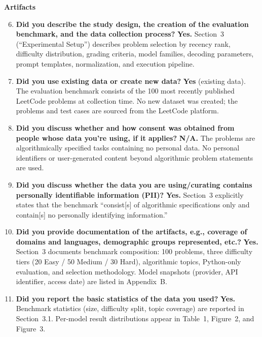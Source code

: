 \documentclass[11pt,a4paper]{article}
\begin{document}
\noindent\textbf{Artifacts}

\begin{enumerate}
\setcounter{enumi}{5}

\item \textbf{Did you describe the study design, the creation of the
  evaluation benchmark, and the data collection process?}
  \textbf{Yes.} Section~3 (``Experimental Setup'') describes problem
  selection by recency rank, difficulty distribution, grading criteria,
  model families, decoding parameters, prompt templates, normalization,
  and execution pipeline.

\item \textbf{Did you use existing data or create new data?}
  \textbf{Yes} (existing data). The evaluation benchmark consists of
  the 100 most recently published LeetCode problems at collection time.
  No new dataset was created; the problems and test cases are sourced
  from the LeetCode platform.

\item \textbf{Did you discuss whether and how consent was obtained
  from people whose data you're using, if it applies?}
  \textbf{N/A.} The problems are algorithmically specified tasks
  containing no personal data. No personal identifiers or user-generated
  content beyond algorithmic problem statements are used.

\item \textbf{Did you discuss whether the data you are using/curating
  contains personally identifiable information (PII)?}
  \textbf{Yes.} Section~3 explicitly states that the benchmark
  ``consist[s] of algorithmic specifications only and contain[s] no
  personally identifying information.''

\item \textbf{Did you provide documentation of the artifacts, e.g.,
  coverage of domains and languages, demographic groups represented,
  etc.?}
  \textbf{Yes.} Section~3 documents benchmark composition: 100 problems,
  three difficulty tiers (20 Easy / 50 Medium / 30 Hard), algorithmic
  topics, Python-only evaluation, and selection methodology. Model
  snapshots (provider, API identifier, access date) are listed in
  Appendix~B.

\item \textbf{Did you report the basic statistics of the data you used?}
  \textbf{Yes.} Benchmark statistics (size, difficulty split, topic
  coverage) are reported in Section~3.1. Per-model result distributions
  appear in Table~1, Figure~2, and Figure~3.

\end{enumerate}
\end{document}
